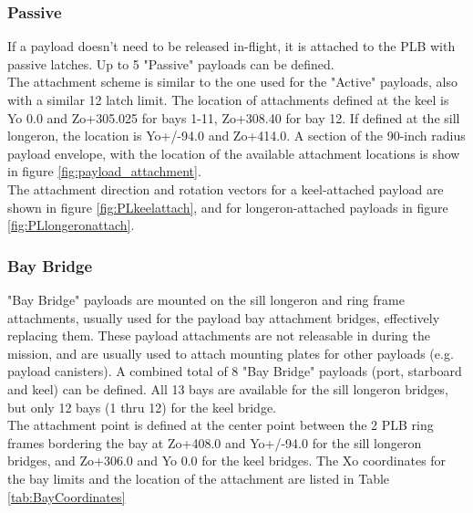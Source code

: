 \documentclass[Space_Shuttle_Vessel_Manual.tex]{subfiles}
\begin{document}
\begin{multicols*}{2}
\subsubsection{Passive}
If a payload doesn't need to be released in-flight, it is attached to the PLB with passive latches. Up to 5 "Passive" payloads can be defined.
\\
The attachment scheme is similar to the one used for the "Active" payloads, also with a similar 12 latch limit. The location of attachments defined at the keel is Yo 0.0 and Zo+305.025 for bays 1-11, Zo+308.40 for bay 12. If defined at the sill longeron, the location is Yo+/-94.0 and Zo+414.0. A section of the 90-inch radius payload envelope, with the location of the available attachment locations is show in figure \ref{fig:payload_attachment}.
\\
The attachment direction and rotation vectors for a keel-attached payload are shown in figure \ref{fig:PLkeelattach}, and for longeron-attached payloads in figure \ref{fig:PLlongeronattach}.


\subsubsection{Bay Bridge}
"Bay Bridge" payloads are mounted on the sill longeron and ring frame attachments, usually used for the payload bay attachment bridges, effectively replacing them. These payload attachments are not releasable in during the mission, and are usually used to attach mounting plates for other payloads (e.g. payload canisters). A combined total of 8 "Bay Bridge" payloads (port, starboard and keel) can be defined. All 13 bays are available for the sill longeron bridges, but only 12 bays (1 thru 12) for the keel bridge.
\\
The attachment point is defined at the center point between the 2 PLB ring frames bordering the bay at Zo+408.0 and Yo+/-94.0 for the sill longeron bridges, and Zo+306.0 and Yo 0.0 for the keel bridges. The Xo coordinates for the bay limits and the location of the attachment are listed in Table \ref{tab:BayCoordinates}



\end{multicols*}
\end{document}
